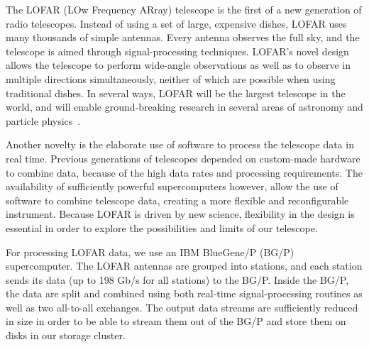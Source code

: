 \documentclass{llncs}
\begin{document}


The LOFAR (LOw Frequency ARray) telescope is the first of a new generation of radio telescopes. Instead of using a set of large, expensive dishes, LOFAR uses many thousands of simple antennas. Every antenna observes the full sky, and the telescope is aimed through signal-processing techniques. LOFAR's novel design allows the telescope to perform wide-angle observations as well as to observe in multiple directions simultaneously, neither of which are possible when using traditional dishes. In several ways, LOFAR will be the largest telescope in the world, and will enable ground-breaking research in several areas of astronomy and particle physics~\cite{Bruyn:02}.

Another novelty is the elaborate use of software to process the telescope data in real time. Previous generations of telescopes depended on custom-made hardware to combine data, because of the high data rates and processing requirements. The availability of sufficiently powerful supercomputers however, allow the use of software to combine telescope data, creating a more flexible and reconfigurable instrument. Because LOFAR is driven by new science, flexibility in the design is essential in order to explore the possibilities and limits of our telescope. 

For processing LOFAR data, we use an IBM BlueGene/P (BG/P) supercomputer. The LOFAR antennas are grouped into stations, and each station sends its data (up to 198 Gb/s for all stations) to the BG/P. Inside the BG/P, the data are split and combined using both real-time signal-processing routines as well as two all-to-all exchanges. The output data streams are sufficiently reduced in size in order to be able to stream them out of the BG/P and store them on disks in our storage cluster.
\end{document}
